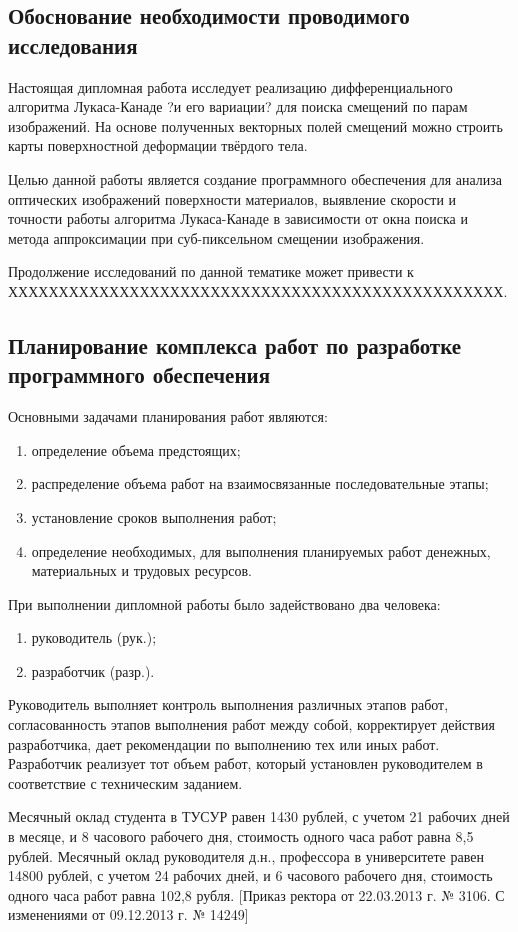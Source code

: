 \subsection{Обоснование необходимости проводимого исследования}

Настоящая дипломная работа исследует реализацию дифференциального алгоритма Лукаса-Канаде ?и его вариации? для поиска смещений по парам изображений. На основе полученных векторных полей смещений можно строить карты поверхностной деформации твёрдого тела. 

Целью данной работы является создание программного обеспечения для анализа оптических изображений поверхности материалов, выявление скорости и точности работы алгоритма Лукаса-Канаде в зависимости от окна поиска и метода аппроксимации при суб-пиксельном смещении изображения.

Продолжение исследований по данной тематике может привести к ХХХХХХХХХХХХХХХХХХХХХХХХХХХХХХХХХХХХХХХХХХХХХХХХХ.
\subsection{Планирование комплекса работ по разработке программного обеспечения}
Основными задачами планирования работ являются:
\begin{enumerate}
\item определение объема предстоящих;
\item распределение объема работ на взаимосвязанные последовательные этапы;
\item установление сроков выполнения работ;
\item определение необходимых, для выполнения планируемых работ денежных, материальных и трудовых ресурсов.
\end{enumerate}
При выполнении дипломной работы было задействовано два человека:
\begin{enumerate}
\item руководитель (рук.);
\item разработчик (разр.).
\end{enumerate}
Руководитель выполняет контроль выполнения различных этапов работ, согласованность этапов выполнения работ между собой, корректирует действия разработчика, дает рекомендации по выполнению тех или иных работ. Разработчик реализует тот объем работ, который установлен руководителем в соответствие с техническим заданием.

Месячный оклад студента в ТУСУР равен 1430 рублей, с учетом 21 рабочих дней в месяце, и 8 часового рабочего дня, стоимость одного часа работ равна 8,5 рублей. Месячный оклад руководителя д.н., профессора в университете равен 14800 рублей, с учетом 24 рабочих дней, и 6 часового рабочего дня, стоимость одного часа работ равна 102,8 рубля. [Приказ ректора от 22.03.2013 г. № 3106. С изменениями от 09.12.2013 г. № 14249]

